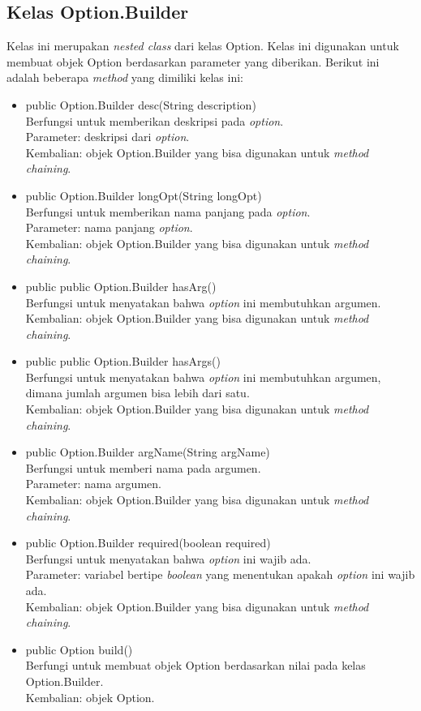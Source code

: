 \subsection{Kelas Option.Builder}
\label{subsec:optionbuilder}
Kelas ini merupakan \textit{nested class} dari kelas Option. Kelas ini digunakan untuk membuat objek Option berdasarkan parameter yang diberikan. Berikut ini adalah beberapa \textit{method} yang dimiliki kelas ini: 
\begin{itemize}
\item public Option.Builder desc(String description)\\
Berfungsi untuk memberikan deskripsi pada \textit{option}.\\
Parameter: deskripsi dari \textit{option}.\\
Kembalian: objek Option.Builder yang bisa digunakan untuk \textit{method chaining}.

\item public Option.Builder longOpt(String longOpt)\\
Berfungsi untuk memberikan nama panjang pada \textit{option}.\\
Parameter: nama panjang \textit{option}.\\
Kembalian: objek Option.Builder yang bisa digunakan untuk \textit{method chaining}.

\item public public Option.Builder hasArg()\\
Berfungsi untuk menyatakan bahwa \textit{option} ini membutuhkan argumen.\\
Kembalian: objek Option.Builder yang bisa digunakan untuk \textit{method chaining}.

\item public public Option.Builder hasArgs()\\
Berfungsi untuk menyatakan bahwa \textit{option} ini membutuhkan argumen, dimana jumlah argumen bisa lebih dari satu.\\
Kembalian: objek Option.Builder yang bisa digunakan untuk \textit{method chaining}.

\item public Option.Builder argName(String argName)\\
Berfungsi untuk memberi nama pada argumen.\\
Parameter: nama argumen.\\
Kembalian: objek Option.Builder yang bisa digunakan untuk \textit{method chaining}.

\item public Option.Builder required(boolean required)\\
Berfungsi untuk menyatakan bahwa \textit{option} ini wajib ada.\\
Parameter: variabel bertipe \textit{boolean} yang menentukan apakah \textit{option} ini wajib ada.\\
Kembalian: objek Option.Builder yang bisa digunakan untuk \textit{method chaining}.

\item public Option build()\\
Berfungi untuk membuat objek Option berdasarkan nilai pada kelas Option.Builder.\\
Kembalian: objek Option.

\end{itemize}


